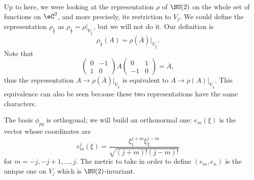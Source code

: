 Up to here, we were looking at the representation $\rho$ of $\SU(2)$ on the whole set of functions on $\eC^2$, and more precisely, its restriction to $V_j$. We could define the representation $\rho_{\frac{1}{2}}$ as $\rho_{\frac{1}{2}}=\rho|_{V_{\frac{1}{2}}}$, but we will not do it. Our definition is
\begin{equation}
	\rho_{\frac{1}{2}}(A)=\rho(\overline{A})|_{V_{\frac{1}{2}}}.
\end{equation}
Note that
\[
	\begin{pmatrix}
		0 & -1 \\
		1 & 0
	\end{pmatrix}
	A
	\begin{pmatrix}
		0  & 1 \\
		-1 & 0
	\end{pmatrix}=\overline{A},
\]
thus the representation $A\to\rho(\overline{A})|_{V_{\frac{1}{2}}}$ is equivalent to $A\to\rho(A)|_{V_{\frac{1}{2}}}$. This equivalence can also be seen because these two representations have the same characters\quextproj.

The basis $\phi_{pq}$ is orthogonal; we will build an orthonormal one: $e_m(\xi)$ is the vector whose coordinates are
\begin{equation}
	e_m^j(\xi)=\frac{ \xi_1^{j+m}\xi_2^{j-m} }{\sqrt{ (j+m)!(j-m)! }}
\end{equation}
for $m=-j,-j+1,\ldots,j$. The metric to take in order to define $(e_m,e_n)$ is the unique one on $V_j$ which is $\SU(2)$-invariant.

